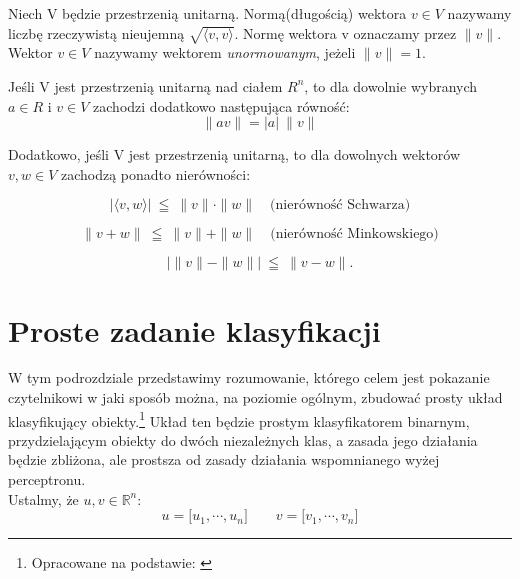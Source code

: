 \begin{definicja}
Niech V będzie przestrzenią unitarną. Normą(długością) wektora $v \in V$ nazywamy liczbę rzeczywistą nieujemną $\sqrt{\big \langle v, v \big \rangle}$. Normę wektora v oznaczamy przez $\|v\|$. Wektor $v \in V$ nazywamy wektorem \textit{unormowanym}, jeżeli $\|v\| = 1$.
\end{definicja}

Jeśli V jest przestrzenią unitarną nad ciałem $R^{n}$, to dla dowolnie wybranych $a \in R$ i $v \in V$ zachodzi dodatkowo następująca równość:
\begin{equation*}
   \|av\| = |a| \ \|v\|
\end{equation*}

Dodatkowo, jeśli V jest przestrzenią unitarną, to dla dowolnych wektorów $v,w \in V$ zachodzą ponadto nierówności:
\begin{figure}[H]
\begin{equation*}
    |\big \langle v, w \big \rangle| \ \leqq \ \|v\| \cdot \|w\| \quad \text{(nierówność Schwarza)}
\end{equation*}

\begin{equation*}
    \|v + w\| \ \leqq \ \|v\| + \|w\| \quad \text{(nierówność Minkowskiego)}
\end{equation*}

\begin{equation*}
    \Bigg| \|v\| - \|w\| \Bigg| \ \leqq \ \|v - w \|.
\end{equation*}
\end{figure}

\section{Proste zadanie klasyfikacji}

W tym podrozdziale przedstawimy rozumowanie, którego celem  jest pokazanie czytelnikowi w jaki sposób można, na poziomie ogólnym, zbudować prosty układ klasyfikujący obiekty.\footnote{Opracowane na podstawie: \citep[s. 11]{Kwiatkowski2007}} Układ ten będzie prostym klasyfikatorem binarnym, przydzielającym obiekty do dwóch niezależnych klas, a zasada jego działania będzie zbliżona, ale prostsza od zasady działania wspomnianego wyżej perceptronu.
\\

Ustalmy, że $u, v \in \mathbb{R}^{n}$:
\begin{equation*}
    u = \big[u_{1},\cdots,u_{n}\big] \qquad v = \big[v_{1},\cdots,v_{n}]
\end{equation*}

